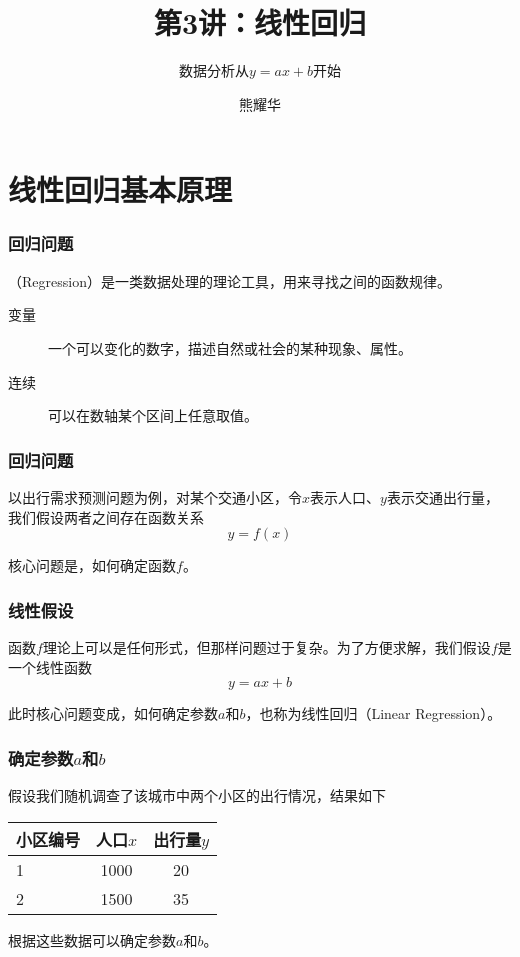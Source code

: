 \documentclass[14pt]{beamer}
\title{第3讲：线性回归}
\subtitle{数据分析从$y=ax+b$开始}
\author{熊耀华}
\institute{交通工程系}
\let\emph\relax %
\begin{document}
\begin{frame}
    \titlepage
\end{frame}

\section{线性回归基本原理}

\begin{frame}
    \frametitle{回归问题}

    \emph{回归}（Regression）是一类数据处理的理论工具，用来寻找\emph{连续变量}之间的函数规律。

    \begin{description}
        \item[变量] 一个可以变化的数字，描述自然或社会的某种现象、属性。
        \item[连续] 可以在数轴某个区间上任意取值。
    \end{description}
\end{frame}

\begin{frame}
    \frametitle{回归问题}
    以出行需求预测问题为例，对某个交通小区，令$x$表示人口、$y$表示交通出行量，我们假设两者之间存在函数关系
        \[ y = f(x) \]

    核心问题是，如何确定函数$f$。
\end{frame}

\begin{frame}
    \frametitle{线性假设}
    函数$f$理论上可以是任何形式，但那样问题过于复杂。为了方便求解，我们假设$f$是一个线性函数
    \[y=ax+b\]

    此时核心问题变成，如何确定参数$a$和$b$，也称为线性回归（Linear Regression）。
\end{frame}

\begin{frame}
    \frametitle{确定参数$a$和$b$}
    假设我们随机调查了该城市中两个小区的出行情况，结果如下
    \begin{table}
        \begin{tabular}{l c c}
            小区编号 & 人口$x$ & 出行量$y$ \\
            \hline\hline
            1   & 1000  & 20 \\
            2   & 1500  & 35 \\
            
        \end{tabular}
    \end{table}

    根据这些数据可以确定参数$a$和$b$。
\end{frame}
\end{document}
